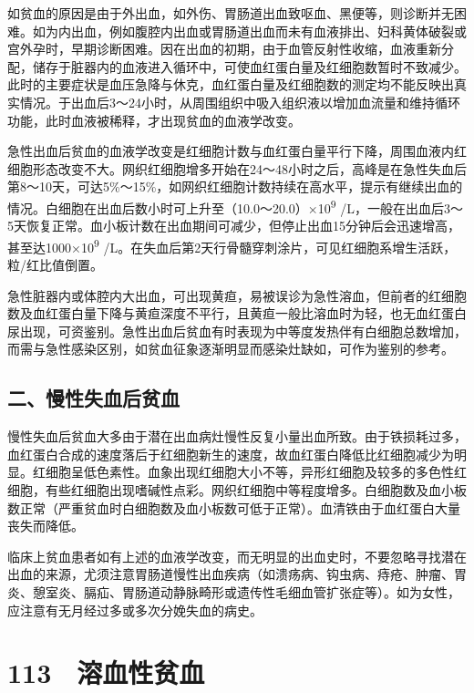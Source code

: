 如贫血的原因是由于外出血，如外伤、胃肠道出血致呕血、黑便等，则诊断并无困难。如为内出血，例如腹腔内出血或胃肠道出血而未有血液排出、妇科黄体破裂或宫外孕时，早期诊断困难。因在出血的初期，由于血管反射性收缩，血液重新分配，储存于脏器内的血液进入循环中，可使血红蛋白量及红细胞数暂时不致减少。此时的主要症状是血压急降与休克，血红蛋白量及红细胞数的测定均不能反映出真实情况。于出血后3～24小时，从周围组织中吸入组织液以增加血流量和维持循环功能，此时血液被稀释，才出现贫血的血液学改变。

急性出血后贫血的血液学改变是红细胞计数与血红蛋白量平行下降，周围血液内红细胞形态改变不大。网织红细胞增多开始在24～48小时之后，高峰是在急性失血后第8～10天，可达5\%～15\%，如网织红细胞计数持续在高水平，提示有继续出血的情况。白细胞在出血后数小时可上升至（10.0～20.0）×10\textsuperscript{9}
/L，一般在出血后3～5天恢复正常。血小板计数在出血期间可减少，但停止出血15分钟后会迅速增高，甚至达1000×10\textsuperscript{9}
/L。在失血后第2天行骨髓穿刺涂片，可见红细胞系增生活跃，粒/红比值倒置。

急性脏器内或体腔内大出血，可出现黄疸，易被误诊为急性溶血，但前者的红细胞数及血红蛋白量下降与黄疸深度不平行，且黄疸一般比溶血时为轻，也无血红蛋白尿出现，可资鉴别。急性出血后贫血有时表现为中等度发热伴有白细胞总数增加，而需与急性感染区别，如贫血征象逐渐明显而感染灶缺如，可作为鉴别的参考。

\subsection{二、慢性失血后贫血}

慢性失血后贫血大多由于潜在出血病灶慢性反复小量出血所致。由于铁损耗过多，血红蛋白合成的速度落后于红细胞新生的速度，故血红蛋白降低比红细胞减少为明显。红细胞呈低色素性。血象出现红细胞大小不等，异形红细胞及较多的多色性红细胞，有些红细胞出现嗜碱性点彩。网织红细胞中等程度增多。白细胞数及血小板数正常（严重贫血时白细胞数及血小板数可低于正常）。血清铁由于血红蛋白大量丧失而降低。

临床上贫血患者如有上述的血液学改变，而无明显的出血史时，不要忽略寻找潜在出血的来源，尤须注意胃肠道慢性出血疾病（如溃疡病、钩虫病、痔疮、肿瘤、胃炎、憩室炎、膈疝、胃肠道动静脉畸形或遗传性毛细血管扩张症等）。如为女性，应注意有无月经过多或多次分娩失血的病史。

\protect\hypertarget{text00258.html}{}{}

\section{113　溶血性贫血}

